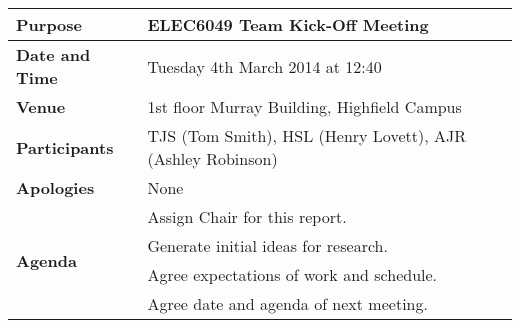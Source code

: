 {}
\begin{center}
\begin{longtable}{| m{} | m{} |} \hline
\textbf{Purpose} & ELEC6049 Team Kick-Off Meeting \\ \hline
\textbf{Date and Time} & Tuesday 4th March 2014 at 12:40 \\ \hline
\textbf{Venue} & 1st floor Murray Building, Highfield Campus \\ \hline
\textbf{Participants} & TJS (Tom Smith), HSL (Henry Lovett), AJR (Ashley Robinson)\\ \hline
\textbf{Apologies} &None \\ \hline
\multirow{4}{*}{\textbf{Agenda}} & Assign Chair for this report. \\
 & Generate initial ideas for research. \\ 
 & Agree expectations of work and schedule. \\
 & Agree date and agenda of next meeting. \\ \hline
\end{longtable}
\end{center}

